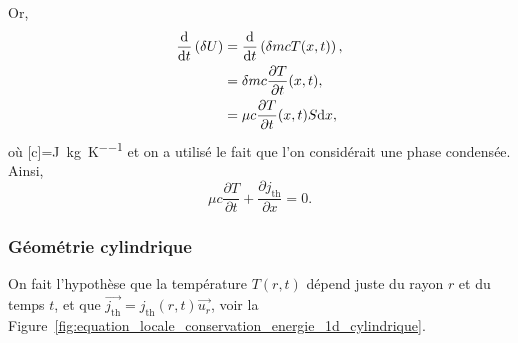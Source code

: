                 Or,
                \begin{align*}
                    \frac{\mathrm{d}}{\mathrm{d} t}\left(\delta U\right)
                    &=
                    \frac{\mathrm{d}}{\mathrm{d} t}\left(\delta m cT(x,t)\right),\\
                    &=
                    \delta m c\frac{\partial T}{\partial t}(x,t),\\
                    &=\mu c\frac{\partial T}{\partial t}(x,t) S\mathrm{d} x,
                \end{align*}
                où [c]=\si{\joule\per\kilogram\per\kelvin} et on a utilisé le fait que l'on considérait une phase condensée. Ainsi,
                \begin{equation*}
                    \boxed{
                        \mu c\frac{\partial T}{\partial t}+\frac{\partial j_{\text{th}}}{\partial x}=0.
                    }
                \end{equation*}

        \subsubsection{Géométrie cylindrique}

            On fait l'hypothèse que la température $T(r,t)$ dépend juste du rayon $r$ et du temps $t$, et que $\vec{j_{\text{th}}}=j_{\text{th}}(r,t)\vec{u_r}$, voir la Figure~\ref{fig:equation_locale_conservation_energie_1d_cylindrique}.

